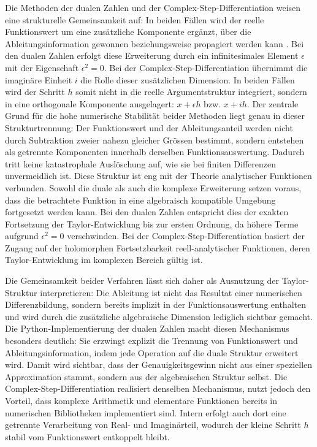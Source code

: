 Die Methoden der dualen Zahlen und der Complex-Step-Differentiation weisen eine strukturelle Gemeinsamkeit auf:
In beiden Fällen wird der reelle Funktionswert um eine zusätzliche Komponente ergänzt, über die Ableitungsinformation gewonnen beziehungsweise propagiert werden kann \cite{step:baydin2018,step:martins2003}.
Bei den dualen Zahlen erfolgt diese Erweiterung durch ein infinitesimales Element $\epsilon$ mit der Eigenschaft $\epsilon^2 = 0$.
Bei der Complex-Step-Differentiation übernimmt die imaginäre Einheit $i$ die Rolle dieser zusätzlichen Dimension.
In beiden Fällen wird der Schritt $h$ somit nicht in die reelle Argumentstruktur integriert, sondern in eine orthogonale Komponente ausgelagert:
$x + \epsilon h$ bzw. $x + ih$.
Der zentrale Grund für die hohe numerische Stabilität beider Methoden liegt genau in dieser Strukturtrennung:
Der Funktionswert und der Ableitungsanteil werden nicht durch Subtraktion zweier nahezu gleicher Grössen bestimmt, sondern entstehen als getrennte Komponenten innerhalb derselben Funktionsauswertung.
Dadurch tritt keine katastrophale Auslöschung auf, wie sie bei finiten Differenzen unvermeidlich ist.
Diese Struktur ist eng mit der Theorie analytischer Funktionen verbunden.
Sowohl die duale als auch die komplexe Erweiterung setzen voraus, dass die betrachtete Funktion in eine algebraisch kompatible Umgebung fortgesetzt werden kann.
Bei den dualen Zahlen entspricht dies der exakten Fortsetzung der Taylor-Entwicklung bis zur ersten Ordnung, da höhere Terme aufgrund $\epsilon^2 = 0$ verschwinden.
Bei der Complex-Step-Differentiation basiert der Zugang auf der holomorphen Fortsetzbarkeit reell-analytischer Funktionen, deren Taylor-Entwicklung im komplexen Bereich gültig ist.

Die Gemeinsamkeit beider Verfahren lässt sich daher als Ausnutzung der Taylor-Struk\-tur interpretieren:
Die Ableitung ist nicht das Resultat einer numerischen Differenzbildung, sondern bereits implizit in der Funktionsauswertung enthalten und wird durch die zusätzliche algebraische Dimension lediglich sichtbar gemacht.
Die Python-Im\-ple\-men\-tie\-rung der dualen Zahlen macht diesen Mechanismus besonders deutlich:
Sie erzwingt explizit die Trennung von Funktionswert und Ableitungsinformation, indem jede Operation auf die duale Struktur erweitert wird.
Damit wird sichtbar, dass der Genauigkeitsgewinn nicht aus einer speziellen Approximation stammt, sondern aus der algebraischen Struktur selbst.
Die Complex-Step-Differentiation realisiert denselben Mechanismus, nutzt jedoch den Vorteil, dass komplexe Arithmetik und elementare Funktionen bereits in numerischen Bibliotheken implementiert sind.
Intern erfolgt auch dort eine getrennte Verarbeitung von Real- und Imaginärteil, wodurch der kleine Schritt $h$ stabil vom Funktionswert entkoppelt bleibt.
